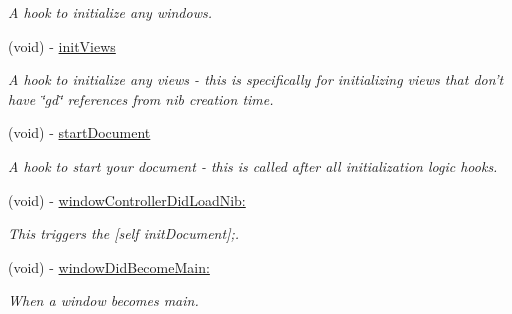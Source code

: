 \begin{DoxyCompactItemize}
\begin{DoxyCompactList}\small\item\em A hook to initialize any windows. \item\end{DoxyCompactList}\item 
(void) -\/ \hyperlink{interface_g_d_document_a9df189df6fe07e6e928157b669741e5b}{initViews}
\begin{DoxyCompactList}\small\item\em A hook to initialize any views -\/ this is specifically for initializing views that don't have \char`\"{}gd\char`\"{} references from nib creation time. \item\end{DoxyCompactList}\item 
\hypertarget{interface_g_d_document_a626438358f3767384f1345990a1d1672}{
(void) -\/ \hyperlink{interface_g_d_document_a626438358f3767384f1345990a1d1672}{startDocument}}
\label{interface_g_d_document_a626438358f3767384f1345990a1d1672}

\begin{DoxyCompactList}\small\item\em A hook to start your document -\/ this is called after all initialization logic hooks. \item\end{DoxyCompactList}\item 
\hypertarget{interface_g_d_document_a29c57bb687ae713e9ba1e8cd1750cd50}{
(void) -\/ \hyperlink{interface_g_d_document_a29c57bb687ae713e9ba1e8cd1750cd50}{windowControllerDidLoadNib:}}
\label{interface_g_d_document_a29c57bb687ae713e9ba1e8cd1750cd50}

\begin{DoxyCompactList}\small\item\em This triggers the \mbox{[}self initDocument\mbox{]};. \item\end{DoxyCompactList}\item 
(void) -\/ \hyperlink{interface_g_d_document_a98f524279b07ab6e5e988206c2f6924e}{windowDidBecomeMain:}
\begin{DoxyCompactList}\small\item\em When a window becomes main. \item\end{DoxyCompactList}\end{DoxyCompactItemize}
